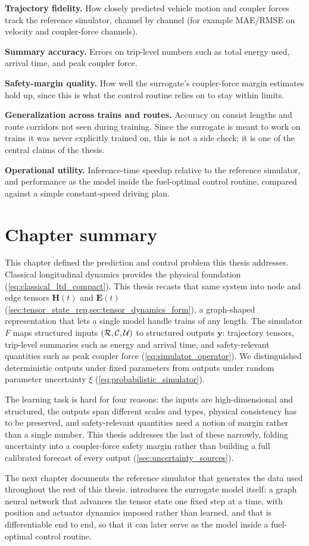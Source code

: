 \textbf{Trajectory fidelity.} How closely predicted vehicle motion and coupler forces track the reference simulator, channel by channel (for example MAE/RMSE on velocity and coupler-force channels).

\textbf{Summary accuracy.} Errors on trip-level numbers such as total energy used, arrival time, and peak coupler force.

\textbf{Safety-margin quality.} How well the surrogate's coupler-force margin estimates hold up, since this is what the control routine relies on to stay within limits.

\textbf{Generalization across trains and routes.} Accuracy on consist lengths and route corridors not seen during training. Since the surrogate is meant to work on trains it was never explicitly trained on, this is not a side check; it is one of the central claims of the thesis.

\textbf{Operational utility.} Inference-time speedup relative to the reference simulator, and performance as the model inside the fuel-optimal control routine, compared against a simple constant-speed driving plan.

\section{Chapter summary}

This chapter defined the prediction and control problem this thesis addresses.
Classical longitudinal dynamics provides the physical foundation (\cref{eq:classical_ltd_compact}).
This thesis recasts that same system into node and edge tensors $\mathbf{H}(t)$ and $\mathbf{E}(t)$ (\cref{sec:tensor_state_rep,sec:tensor_dynamics_form}), a graph-shaped representation that lets a single model handle trains of any length.
The simulator $F$ maps structured inputs $(\mathcal{R}, \mathcal{C}, \mathcal{U})$ to structured outputs $\mathbf{y}$: trajectory tensors, trip-level summaries such as energy and arrival time, and safety-relevant quantities such as peak coupler force (\cref{eq:simulator_operator}).
We distinguished deterministic outputs under fixed parameters from outputs under random parameter uncertainty $\xi$ (\cref{eq:probabilistic_simulator}).

The learning task is hard for four reasons: the inputs are high-dimensional and structured, the outputs span different scales and types, physical consistency has to be preserved, and safety-relevant quantities need a notion of margin rather than a single number.
This thesis addresses the last of these narrowly, folding uncertainty into a coupler-force safety margin rather than building a full calibrated forecast of every output (\cref{sec:uncertainty_sources}).

The next chapter documents the reference simulator that generates the data used throughout the rest of this thesis.
 introduces the surrogate model itself: a graph neural network that advances the tensor state one fixed step at a time, with position and actuator dynamics imposed rather than learned, and that is differentiable end to end, so that it can later serve as the model inside a fuel-optimal control routine.

